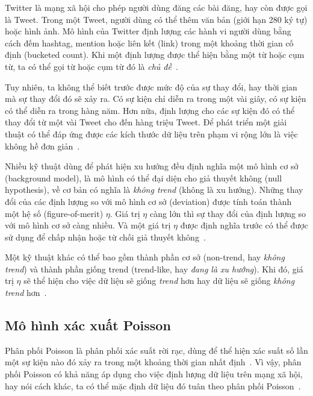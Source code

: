 Twitter là mạng xã hội cho phép người dùng đăng các bài đăng, hay còn được gọi là Tweet. Trong một Tweet, người dùng có thể thêm văn bản (giới hạn 280 ký tự) hoặc hình ảnh. Mô hình của Twitter định lượng các hành vi người dùng bằng cách đếm hashtag, mention hoặc liên kết (link) trong một khoảng thời gian cố định (bucketed count). Khi một định lượng được thể hiện bằng một từ hoặc cụm từ, ta có thể gọi từ hoặc cụm từ đó là \textit{chủ đề}~\cite{hendricksonTrendDetectionSocial2015}.

Tuy nhiên, ta không thể biết trước được mức độ của sự thay đổi, hay thời gian mà sự thay đổi đó sẽ xảy ra. Có sự kiện chỉ diễn ra trong một vài giây, có sự kiện có thể diễn ra trong hàng năm. Hơn nữa, định lượng cho các sự kiện đó có thể thay đổi từ một vài Tweet cho đến hàng triệu Tweet. Để phát triển một giải thuật có thể đáp ứng được các kích thước dữ liệu trên phạm vi rộng lớn là việc không hề đơn giản~\cite{hendricksonTrendDetectionSocial2015}.

Nhiều kỹ thuật dùng để phát hiện xu hướng đều định nghĩa một mô hình cơ sở (background model), là mô hình có thể đại diện cho giả thuyết không (null hypothesis), về cơ bản có nghĩa là \textit{không trend} (không là xu hướng).  Những thay đổi của các định lượng so với mô hình cơ sở (deviation) được tính toán thành một hệ số (figure-of-merit) $\eta$. Giá trị $\eta$ càng lớn thì sự thay đổi của định lượng so với mô hình cơ sở càng nhiều. Và một giá trị $\eta$ được định nghĩa trước có thể được sử dụng để chấp nhận hoặc từ chối giả thuyết không~\cite{hendricksonTrendDetectionSocial2015}.

Một kỹ thuật khác có thể bao gồm thành phần cơ sở (non-trend, hay \textit{không trend}) và thành phần giống trend (trend-like, hay \textit{đang là xu hướng}).  Khi đó, giá trị $\eta$ sẽ thể hiện cho việc dữ liệu sẽ giống \textit{trend} hơn hay dữ liệu sẽ giống \textit{không trend} hơn~\cite{hendricksonTrendDetectionSocial2015}.

\subsection{Mô hình xác xuất Poisson}

Phân phối Poisson là phân phối xác suất rời rạc, dùng để thể hiện xác suất số lần một sự kiện nào đó xảy ra trong một khoảng thời gian nhất định~\cite{haightHandbookPoissonDistribution1967}. Vì vậy, phân phối Poisson có khả năng áp dụng cho việc định lượng dữ liệu trên mạng xã hội, hay nói cách khác, ta có thể mặc định dữ liệu đó tuân theo phân phối Poisson~\cite{hendricksonTrendDetectionSocial2015}.


